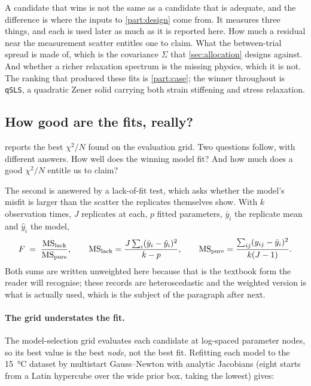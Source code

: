 \documentclass[10pt]{article}
\begin{document}
A candidate that wins is not the same as a candidate that is adequate, and the difference is
where the inputs to \cref{part:design} come from. It measures three things, and each is used later as much as it is
reported here. How much a residual near the measurement scatter entitles one to claim. What the
between-trial spread is made of, which is the covariance $\Sigma$ that \cref{sec:allocation}
designs against. And whether a richer relaxation spectrum is the missing physics, which it is
not. The ranking that produced these fits
is \cref{part:case}; the winner throughout is \texttt{qSLS}, a quadratic Zener solid carrying
both strain stiffening and stress relaxation.

\subsection{How good are the fits, really?}
\label{sec:fitquality}

 reports the best $\chi^2/N$ found on the evaluation grid. Two questions
follow, with different answers. How well does the winning model fit? And how much does a good
$\chi^2/N$ entitle us to claim?

The second is answered by a lack-of-fit test, which asks whether the model's misfit is larger
than the scatter the replicates themselves show. With $k$ observation times, $J$ replicates at
each, $p$ fitted parameters, $\bar y_i$ the replicate mean and $\hat y_i$ the model,
%
\begin{equation}
F \;=\; \frac{\mathrm{MS}_{\rm lack}}{\mathrm{MS}_{\rm pure}},
\qquad
\mathrm{MS}_{\rm lack} = \frac{J\sum_i (\bar y_i - \hat y_i)^2}{k-p},
\qquad
\mathrm{MS}_{\rm pure} = \frac{\sum_{ij} (y_{ij} - \bar y_i)^2}{k(J-1)} .
\label{eq:lackoffit}
\end{equation}
%
\noindent Both sums are written unweighted here because that is the textbook form the reader
will recognise; these records are heteroscedastic and the weighted version is what is actually
used, which is the subject of the paragraph after next.

\paragraph{The grid understates the fit.}
The model-selection grid evaluates each candidate at log-spaced parameter nodes, so its
best value is the best \emph{node}, not the best fit. Refitting each model to the
\SI{15}{\celsius} dataset by multistart Gauss--Newton with analytic Jacobians (eight
starts from a Latin hypercube over the wide prior box, taking the lowest) gives:
\end{document}
